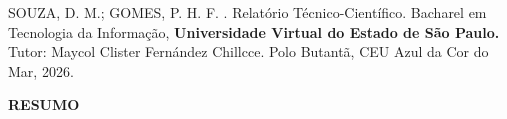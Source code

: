 \documentclass[
    12pt,
    oneside,            %
    a4paper,
    brazilian
    ]{abntex2}
\begin{document}





\noindent
SOUZA, D. M.; GOMES, P. H. F. \textbf{\imprimirtitulo{}}. Relatório Técnico-Científico. Bacharel em Tecnologia da Informação, \textbf{Universidade Virtual do Estado de São Paulo.} Tutor: Maycol Clister Fernández Chillcce. Polo Butantã, CEU Azul da Cor do Mar, 2026.
\vspace*{2.5cm}

\noindent
\textbf{RESUMO}

\vspace{0.6cm}
\end{document}
